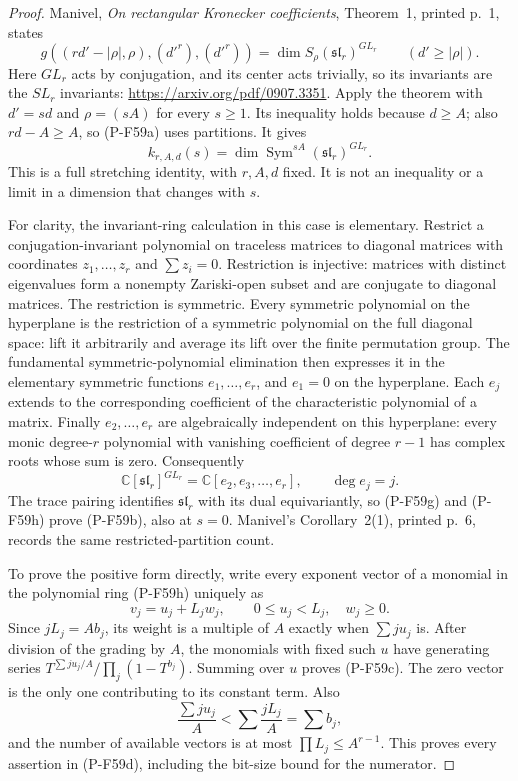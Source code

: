 \begin{proof}
Manivel, \emph{On rectangular Kronecker coefficients},
Theorem~1, printed p.~1, states
\[
 g((rd'-|\rho|,\rho),(d'^r),(d'^r))
                   =\dim S_{\rho}(\mathfrak{sl}_r)^{GL_r}
       \qquad(d'\ge|\rho|).
\]
Here $GL_r$ acts by conjugation, and its center acts trivially,
so its invariants are the $SL_r$ invariants:
\url{https://arxiv.org/pdf/0907.3351}.
Apply the theorem with $d'=sd$ and $\rho=(sA)$ for every
$s\ge1$. Its inequality holds because $d\ge A$; also
$rd-A\ge A$, so (P-F59a) uses partitions. It gives
\[
       k_{r,A,d}(s)
          =\dim\operatorname{Sym}^{sA}
                           (\mathfrak{sl}_r)^{GL_r}.
                                                               \tag{P-F59g}
\]
This is a full stretching identity, with $r,A,d$ fixed.
It is not an inequality or a limit in a dimension that changes
with $s$.

For clarity, the invariant-ring calculation in this case is
elementary. Restrict a conjugation-invariant polynomial on
traceless matrices to diagonal matrices with coordinates
$z_1,\ldots,z_r$ and $\sum z_i=0$. Restriction is injective:
matrices with distinct eigenvalues form a nonempty Zariski-open
subset and are conjugate to diagonal matrices. The restriction
is symmetric. Every symmetric polynomial on the hyperplane is
the restriction of a symmetric polynomial on the full diagonal
space: lift it arbitrarily and average its lift over the finite
permutation group. The fundamental symmetric-polynomial
elimination then expresses it in the elementary symmetric
functions $e_1,\ldots,e_r$, and $e_1=0$ on the hyperplane.
Each $e_j$ extends to the corresponding coefficient of the
characteristic polynomial of a matrix. Finally $e_2,\ldots,e_r$
are algebraically independent on this hyperplane: every monic
degree-$r$ polynomial with vanishing coefficient of degree
$r-1$ has complex roots whose sum is zero. Consequently
\[
 \mathbb C[\mathfrak{sl}_r]^{GL_r}
                  =\mathbb C[e_2,e_3,\ldots,e_r],
                    \qquad \deg e_j=j.
                                                               \tag{P-F59h}
\]
The trace pairing identifies $\mathfrak{sl}_r$ with its dual
equivariantly, so (P-F59g) and (P-F59h) prove (P-F59b), also
at $s=0$. Manivel's Corollary~2(1), printed p.~6, records the
same restricted-partition count.

To prove the positive form directly, write every exponent vector
of a monomial in the polynomial ring (P-F59h) uniquely as
\[
                    v_j=u_j+L_jw_j,
              \qquad 0\le u_j<L_j,\quad w_j\ge0.
\]
Since $jL_j=Ab_j$, its weight is a multiple of $A$ exactly
when $\sum ju_j$ is. After division of the grading by $A$,
the monomials with fixed such $u$ have generating series
$T^{\sum ju_j/A}/\prod_j(1-T^{b_j})$.
Summing over $u$ proves (P-F59c). The zero vector is the only
one contributing to its constant term. Also
\[
       \frac{\sum ju_j}{A}
             <\sum\frac{jL_j}{A}=\sum b_j,
\]
and the number of available vectors is at most
$\prod L_j\le A^{r-1}$. This proves every assertion in
(P-F59d), including the bit-size bound for the numerator.


\end{proof}
